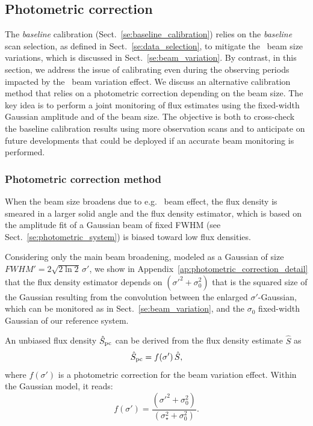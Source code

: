 \subsection{Photometric correction}
\label{se:photometric_correction}

The \emph{baseline} calibration (Sect.~\ref{se:baseline_calibration}) relies
on the \emph{baseline} scan selection, as defined in Sect.~\ref{se:data_selection}, to
mitigate the \afternoon\ beam size variations, which is discussed in
Sect.~\ref{se:beam_variation}. By contrast, in this section, we
address the issue of calibrating even during the observing periods
impacted by the \afternoon\ beam variation effect. We discuss an
alternative calibration method that
relies on a photometric correction depending on the beam size.
{\lp The key idea is to perform a joint monitoring of flux estimates
  using the fixed-width Gaussian amplitude and of the beam size.}
The objective is both to cross-check the baseline calibration results
using more observation scans and to anticipate on future developments
that could be deployed if an accurate beam monitoring is performed.


\subsubsection{Photometric correction method}
\label{se:photometric_correction_method}

When the beam size broadens due to e.g. \afternoon\ beam effect, the
flux density is smeared in a larger solid angle and
the flux density estimator, which is based on the amplitude fit of a
Gaussian beam of fixed FWHM (see
Sect.~\ref{se:photometric_system}) is biased toward low flux
densities.

Considering only the main beam broadening, modeled as a Gaussian of
size $FWHM' = 2 \sqrt{2\ln{2}} \, \sigma '$, we show in
Appendix~\ref{ap:photometric_correction_detail} that
the flux density estimator depends on {\lp $(\sigma'^2 +\sigma_0^2)$
  that is the squared size of the Gaussian
  resulting from the convolution} between the enlarged
$\sigma '$-Gaussian, which can be monitored as in Sect.~\ref{se:beam_variation}, and the 
$\sigma_0$ fixed-width Gaussian of our reference system.

An unbiased
flux density $\hat{S}_{\rm{pc}}$ can be derived from the flux density
estimate $\hat{S}$ as
\begin{equation}
  \hat{S}_{\rm{pc}} = f(\sigma')\, \hat{S},
\end{equation}
where $f(\sigma')$ is a photometric correction for the beam variation
effect. Within the Gaussian model, it reads:
\begin{equation}
  f(\sigma') = \frac{(\sigma'^2 + \sigma_0^2)}{(\sigma_{\star}^2 + \sigma_0^2)}. 
\end{equation} 

